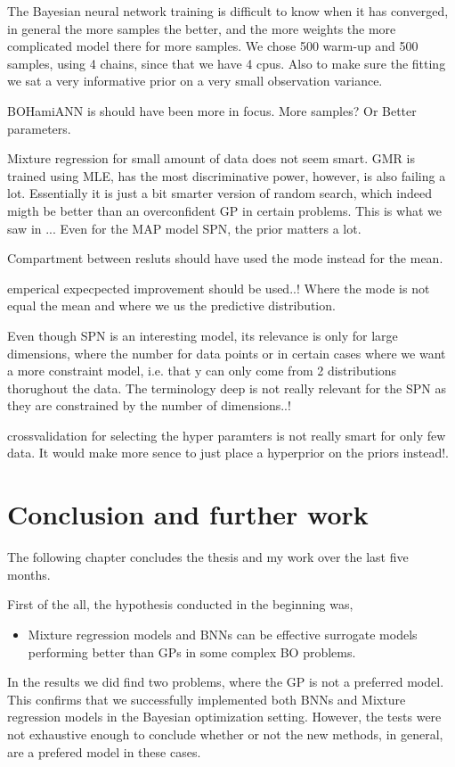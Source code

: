 The Bayesian neural network training is difficult to know when it has converged, in general the more samples the better, 
and the more weights the more complicated model there for more samples. We chose 500 warm-up and 500 samples, using 4
chains, since that we have 4 cpus. Also to make sure the fitting we sat a very informative prior on a very small observation
variance. 

BOHamiANN is should have been more in focus. More samples? Or Better parameters. 
% 

Mixture regression for small amount of data does not seem smart. GMR is trained using MLE, has the most discriminative power,
however, is also failing a lot. Essentially it is just a bit smarter version of random search, which indeed migth be
better than an overconfident GP in certain problems. This is what we saw in ... Even for the MAP model SPN, the prior
matters a lot. 

Compartment between resluts should have used the mode instead for the mean. 

emperical expecpected improvement should be used..! Where the mode is not equal the mean and where we
us the predictive distribution. 

Even though SPN is an interesting model, its relevance is only for large dimensions, where the number for data points
or in certain cases where we want a more constraint model, i.e. that y can only come from 2 distributions thorughout the
data. The terminology deep is not really relevant for the SPN as they are constrained by the number of dimensions..!

crossvalidation for selecting the hyper paramters is not really smart for only few data. It would make more sence 
to just place a hyperprior on the priors instead!. 


\chapter{Conclusion and further work}
The following chapter concludes the thesis and my work over the last five months. 

First of the all, the hypothesis conducted in the beginning was, 
\begin{itemize}
    \item Mixture regression models and BNNs can be effective surrogate models
    performing better than GPs in some complex BO problems. 
\end{itemize}
In the results we did find two problems, where the GP is not a preferred model. This confirms that
we successfully implemented both BNNs and Mixture regression models in the Bayesian optimization setting.  
However, the tests were not exhaustive enough to conclude whether or not the new methods, in general, 
are a prefered model in these cases. 

